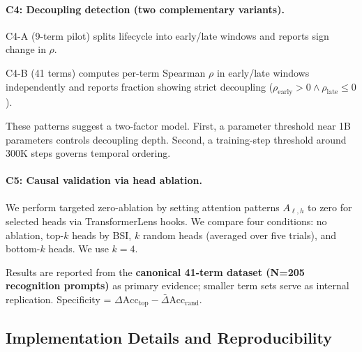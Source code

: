 \documentclass[10pt]{article} %
\begin{document}
\paragraph{C4: Decoupling detection (two complementary variants).}

C4-A (9-term pilot) splits lifecycle into early/late windows and reports sign change in $\rho$.

C4-B (41 terms) computes per-term Spearman $\rho$ in early/late windows independently and reports fraction showing strict decoupling ($\rho_\text{early} > 0 \land \rho_\text{late} \leq 0$).

These patterns suggest a two-factor model. First, a parameter threshold near 1B parameters controls decoupling depth. Second, a training-step threshold around 300K steps governs temporal ordering.

\paragraph{C5: Causal validation via head ablation.}

We perform targeted zero-ablation by setting attention patterns $A_{\ell,h}$ to zero for selected heads via TransformerLens hooks. We compare four conditions: no ablation, top-$k$ heads by BSI, $k$ random heads (averaged over five trials), and bottom-$k$ heads.
We use $k=4$.

Results are reported from the \textbf{canonical 41-term dataset (N=205 recognition prompts)} as primary evidence; smaller term sets serve as internal replication.
Specificity = $\Delta\text{Acc}_\text{top} - \bar{\Delta}\text{Acc}_\text{rand}$.

\subsection{Implementation Details and Reproducibility}
\end{document}
